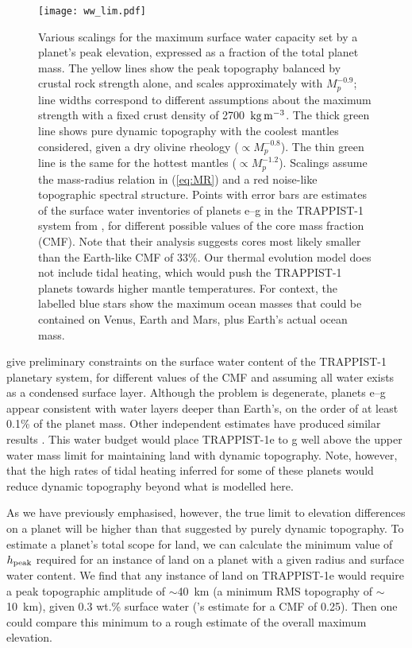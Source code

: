  
\begin{figure}
    \centering
    \texttt{[image: ww\_lim.pdf]}
    \caption[Various scalings for the maximum surface water capacity set by a planet's peak elevation.]{Various scalings for the maximum surface water capacity set by a planet's peak elevation, expressed as a fraction of the total planet mass. The yellow lines show the peak topography balanced by crustal rock strength alone, and scales approximately with $M_p^{-0.9}$; line widths correspond to different assumptions about the maximum strength with a fixed crust density of 2700~$\rm{kg\,m^{-3}}$. The thick green line shows pure dynamic topography with the coolest mantles considered, given a dry olivine rheology ($\propto M_p^{-0.8}$). The thin green line is the same for the hottest mantles ($\propto M_p^{-1.2}$). Scalings assume the mass-radius relation in (\ref{eq:MR}) and a red noise-like topographic spectral structure. Points with error bars are estimates of the surface water inventories of planets e--g in the TRAPPIST-1 system from \citet{agol_refining_2021}, for different possible values of the core mass fraction (CMF). Note that their analysis suggests cores most likely smaller than the Earth-like CMF of 33\%. Our thermal evolution model does not include tidal heating, which would push the TRAPPIST-1 planets towards higher mantle temperatures. For context, the labelled blue stars show the maximum ocean masses that could be contained on Venus, Earth and Mars, plus Earth's actual ocean mass.}
    \label{fig:max-ocn}
\end{figure}
 

\citet{agol_refining_2021} give preliminary constraints on the surface water content of the TRAPPIST-1 planetary system, for different values of the CMF and assuming all water exists as a condensed surface layer. Although the problem is degenerate, planets e--g appear consistent with water layers deeper than Earth's, on the order of at least 0.1\% of the planet mass. Other independent estimates have produced similar results \citep{acuna_characterisation_2021}.  %
This water budget would place TRAPPIST-1e to g well above the upper water mass limit for maintaining land with dynamic topography. Note, however, that the high rates of tidal heating inferred for some of these planets \citep{barr_interior_2018} would reduce dynamic topography beyond what is modelled here.

As we have previously emphasised, however, the true limit to elevation differences on a planet will be higher than that suggested by purely dynamic topography. To estimate a planet's total scope for land, we can calculate the minimum value of $h_{\rm peak}$ required for an instance of land on a planet with a given radius and surface water content. We find that any instance of land on TRAPPIST-1e would require a peak topographic amplitude of $\sim$40~km (a minimum RMS topography of $\sim$10~km), given 0.3 wt.\% surface water (\citeauthor{agol_refining_2021}'s estimate for a CMF of 0.25). Then one could compare this minimum to a rough estimate of the overall maximum elevation. %

